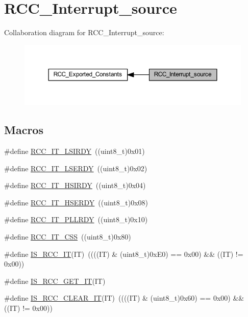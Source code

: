 \hypertarget{group___r_c_c___interrupt__source}{}\section{R\+C\+C\+\_\+\+Interrupt\+\_\+source}
\label{group___r_c_c___interrupt__source}
Collaboration diagram for R\+C\+C\+\_\+\+Interrupt\+\_\+source\+:
\nopagebreak
\begin{figure}[H]
\begin{center}
\leavevmode
\includegraphics[width=350pt]{group___r_c_c___interrupt__source}
\end{center}
\end{figure}
\subsection*{Macros}
\begin{DoxyCompactItemize}
\item 
\#define \hyperlink{group___r_c_c___interrupt__source_ga2b4ef277c1b71f96e0bef4b9a72fca94}{R\+C\+C\+\_\+\+I\+T\+\_\+\+L\+S\+I\+R\+DY}~((uint8\+\_\+t)0x01)
\item 
\#define \hyperlink{group___r_c_c___interrupt__source_gad6b6e78a426850f595ef180d292a673d}{R\+C\+C\+\_\+\+I\+T\+\_\+\+L\+S\+E\+R\+DY}~((uint8\+\_\+t)0x02)
\item 
\#define \hyperlink{group___r_c_c___interrupt__source_ga69637e51b71f73f519c8c0a0613d042f}{R\+C\+C\+\_\+\+I\+T\+\_\+\+H\+S\+I\+R\+DY}~((uint8\+\_\+t)0x04)
\item 
\#define \hyperlink{group___r_c_c___interrupt__source_gad13eaede352bca59611e6cae68665866}{R\+C\+C\+\_\+\+I\+T\+\_\+\+H\+S\+E\+R\+DY}~((uint8\+\_\+t)0x08)
\item 
\#define \hyperlink{group___r_c_c___interrupt__source_ga68d48e7811fb58f2649dce6cf0d823d9}{R\+C\+C\+\_\+\+I\+T\+\_\+\+P\+L\+L\+R\+DY}~((uint8\+\_\+t)0x10)
\item 
\#define \hyperlink{group___r_c_c___interrupt__source_ga9bb34a4912d2084dc1c0834eb53aa7a3}{R\+C\+C\+\_\+\+I\+T\+\_\+\+C\+SS}~((uint8\+\_\+t)0x80)
\item 
\#define \hyperlink{group___r_c_c___interrupt__source_ga710d72ccf88ddbec09b033c81a571a83}{I\+S\+\_\+\+R\+C\+C\+\_\+\+IT}(IT)~((((IT) \& (uint8\+\_\+t)0x\+E0) == 0x00) \&\& ((\+I\+T) != 0x00))
\item 
\#define \hyperlink{group___r_c_c___interrupt__source_ga7a1b771d6d9c2d8346ab58a1f046f6a6}{I\+S\+\_\+\+R\+C\+C\+\_\+\+G\+E\+T\+\_\+\+IT}(IT)
\item 
\#define \hyperlink{group___r_c_c___interrupt__source_ga8374741e47d696accd1a72647650ba63}{I\+S\+\_\+\+R\+C\+C\+\_\+\+C\+L\+E\+A\+R\+\_\+\+IT}(IT)~((((IT) \& (uint8\+\_\+t)0x60) == 0x00) \&\& ((\+I\+T) != 0x00))
\end{DoxyCompactItemize}


